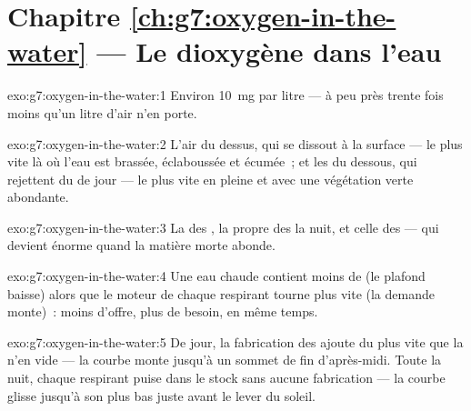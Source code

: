 \section*{Chapitre \ref{ch:g7:oxygen-in-the-water} --- Le dioxygène dans l'eau}

\begin{solution}{exo:g7:oxygen-in-the-water:1}
Environ \qty{10}{mg} par litre --- à peu près trente fois moins
qu'un litre d'air n'en porte.
\end{solution}

\begin{solution}{exo:g7:oxygen-in-the-water:2}
L'air du dessus, qui se dissout à la surface --- le plus vite là où
l'eau est brassée, éclaboussée et écumée~; et les  du
dessous, qui rejettent du  de jour --- le plus vite en
pleine  et avec une végétation verte abondante.
\end{solution}

\begin{solution}{exo:g7:oxygen-in-the-water:3}
La  des , la  propre des  la
nuit, et celle des  --- qui devient énorme quand la
matière morte abonde.
\end{solution}

\begin{solution}{exo:g7:oxygen-in-the-water:4}
Une eau chaude contient moins de  (le plafond
baisse) alors que le moteur de chaque respirant tourne plus vite (la
demande monte)~: moins d'offre, plus de besoin, en même temps.
\end{solution}

\begin{solution}{exo:g7:oxygen-in-the-water:5}
De jour, la fabrication des  ajoute du  plus
vite que la  n'en vide --- la courbe monte jusqu'à un
sommet de fin d'après-midi. Toute la nuit, chaque respirant puise
dans le stock sans aucune fabrication --- la courbe glisse jusqu'à
son plus bas juste avant le lever du soleil.
\end{solution}

